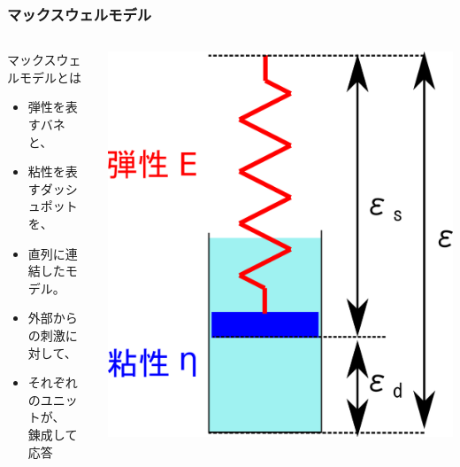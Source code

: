 \documentclass[12pt, dvipdfmx]{beamer}
\begin{document}
\begin{frame}
	\frametitle{マックスウェルモデル}
		\begin{columns}[T, onlytextwidth]
				\begin{block}{マックスウェルモデルとは}
					\begin{itemize}
						\item 弾性を表すバネと、
						\item 粘性を表すダッシュポットを、
						\item 直列に連結したモデル。
						\item 外部からの刺激に対して、
						\item それぞれのユニットが、\\錬成して応答
					\end{itemize}
				\end{block}
				\includegraphics[width=\textwidth]{Maxwell_model.png}
		\end{columns}
\end{frame}
\end{document}
